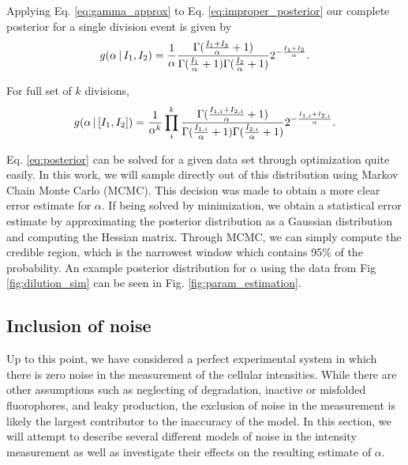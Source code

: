 Applying Eq. \ref{eq:gamma_approx} to Eq. \ref{eq:improper_posterior} our
complete posterior for a single division event is given by
\begin{equation}
  g(\alpha\,\vert\, I_1, I_2)= {1 \over \alpha}{\Gamma({I_1 + I_2 \over \alpha} + 1) \over \Gamma({I_1 \over \alpha} +1 )\Gamma({I_2 \over \alpha} + 1)}2^{-{I_1 + I_2 \over \alpha}}.
\end{equation}

For full set of $k$ divisions,
\begin{equation}
  g(\alpha\, \vert\, [I_1, I_2]) ={1 \over \alpha^k}\prod\limits_i^k {\Gamma({I_{1,i} + I_{2,i} \over \alpha} + 1) \over \Gamma({I_{1,i} \over \alpha} + 1) \Gamma({I_{2,i} \over \alpha} + 1)}2^{-{I_{1,i} + I_{2,i} \over \alpha }}.
\label{eq:posterior}
\end{equation}

Eq. \ref{eq:posterior} can be solved for a given data set through optimization
quite easily. In this work, we will sample directly out of this distribution
using Markov Chain Monte Carlo (MCMC). This decision was made to obtain a more
clear error estimate for $\alpha$. If being solved by minimization, we obtain
a statistical error estimate by approximating the posterior distribution as a
Gaussian distribution and computing the Hessian matrix. Through MCMC, we can
simply compute the credible region, which is the narrowest window which contains
95\% of the probability. An example posterior distribution for $\alpha$ using
the data from Fig \ref{fig:dilution_sim} can be seen in Fig. \ref{fig:param_estimation}.

\begin{figure}[h!]
\end{figure}

\subsection*{Inclusion of noise}
Up to this point, we have considered a perfect experimental system in which
there is zero noise in the measurement of the cellular intensities. While there
are other assumptions such as neglecting of degradation, inactive or misfolded
fluorophores, and leaky production, the exclusion of noise in the measurement
is likely the largest contributor to the inaccuracy of the model. In this section,
we will attempt to describe several different models of noise in the intensity
measurement as well as investigate their effects on the resulting estimate of
$\alpha$.

